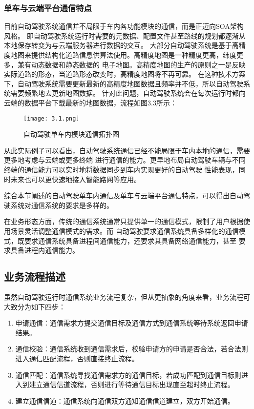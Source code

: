 \subsubsection{单车与云端平台通信特点}
目前自动驾驶系统通信并不局限于车内各功能模块的通信，而是正迈向SOA架构风格。
即自动驾驶系统运行时需要的元数据、配置文件甚至路线的规划都逐渐从本地保存转变为与云端服务器进行数据的交互。
大部分自动驾驶系统是基于高精度地图来提供结构化道路信息供算法使用。高精度地图是一种精度更高，纬度更多，兼有动态数据和静态数据的
电子地图。高精度地图的生产的原则之一是反映实际道路的形态，当道路形态改变时，高精度地图将不再可靠。
在这种技术方案下，自动驾驶系统需要更新最新的高精度地图数据且频率并不低，所以自动驾驶系统需要频繁地去更新地图数据。
针对此问题，自动驾驶系统会在每次运行时都向云端的数据平台下载最新的地图数据，流程如图3.3所示：
\begin{figure}[htb]
  \centering
  \texttt{[image: 3.1.png]}
  \caption{自动驾驶单车内模块通信拓扑图}
  \label{fig:15}
\end{figure}
从此实际例子可以看出，自动驾驶系统通信已经不能局限于车内本地的通信，需要更多地考虑与云端或更多终端
进行通信的能力。更早地布局自动驾驶车辆与不同终端的通信能力可以实时地将数据同步到车内实现更好的自动驾驶
性能表现，同时未来也可以更快速地接入智能路网等应用。

综合本节阐述的自动驾驶单车内通信及单车与云端平台通信特点，可以得出自动驾驶系统对通信系统的要求是多样的。

在业务形态方面，传统的通信系统通常只提供单一的通信模式，限制了用户根据使用场景灵活调整通信模式的需求。而
自动驾驶要求通信系统具备多样化的通信模式，既要求通信系统具备进程间通信能力，还要求其具备网络通信能力，甚至
要求具备进程内通信能力。

\subsection{业务流程描述}
虽然自动驾驶运行时通信系统业务流程复杂，但从更抽象的角度来看，业务流程可大致分为如下四步：
\begin{enumerate}
  \item 申请通信：通信需求方提交通信目标及通信方式到通信系统等待系统返回申请结果。
  \item 通信校验：通信系统收到通信需求后，校验申请方的申请是否合法，若合法则进入通信匹配流程，否则直接终止流程。
  \item 通信匹配：通信系统寻找通信需求方的通信目标，若成功匹配到通信目标则进入到建立通信信道流程，否则进行等待通信目标出现直至超时终止流程。
  \item 建立通信信道：通信系统向通信双方通知通信信道建立，双方开始通信。
\end{enumerate}

